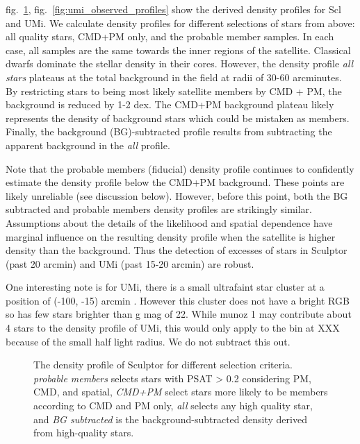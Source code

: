 fig.~\ref{fig:scl_observed_profiles},
fig.~\ref{fig:umi_observed_profiles} show the derived density profiles
for Scl and UMi. We calculate density profiles for different selections
of stars from above: all quality stars, CMD+PM only, and the probable
member samples. In each case, all samples are the same towards the inner
regions of the satellite. Classical dwarfs dominate the stellar density
in their cores. However, the density profile \emph{all stars} plateaus
at the total background in the field at radii of 30-60 arcminutes. By
restricting stars to being most likely satellite members by CMD + PM,
the background is reduced by 1-2 dex. The CMD+PM background plateau
likely represents the density of background stars which could be
mistaken as members. Finally, the background (BG)-subtracted profile
results from subtracting the apparent background in the \emph{all}
profile.

Note that the probable members (fiducial) density profile continues to
confidently estimate the density profile below the CMD+PM background.
These points are likely unreliable (see discussion below). However,
before this point, both the BG subtracted and probable members density
profiles are strikingly similar. Assumptions about the details of the
likelihood and spatial dependence have marginal influence on the
resulting density profile when the satellite is higher density than the
background. Thus the detection of excesses of stars in Sculptor (past 20
arcmin) and UMi (past 15-20 arcmin) are robust.

One interesting note is for UMi, there is a small ultrafaint star
cluster at a position of (-100, -15) arcmin \citet{munoz+2012}. However
this cluster does not have a bright RGB so has few stars brighter than g
mag of 22. While munoz 1 may contribute about 4 stars to the density
profile of UMi, this would only apply to the bin at XXX because of the
small half light radius. We do not subtract this out.

\begin{figure}
\centering
{}
\caption[Sculptor density profiles]{The density profile of Sculptor for
different selection criteria. \emph{probable members} selects stars with
PSAT \textgreater{} 0.2 considering PM, CMD, and spatial, \emph{CMD+PM}
select stars more likely to be members according to CMD and PM only,
\emph{all} selects any high quality star, and \emph{BG subtracted} is
the background-subtracted density derived from high-quality
stars.}\label{fig:scl_observed_profiles}
\end{figure}

